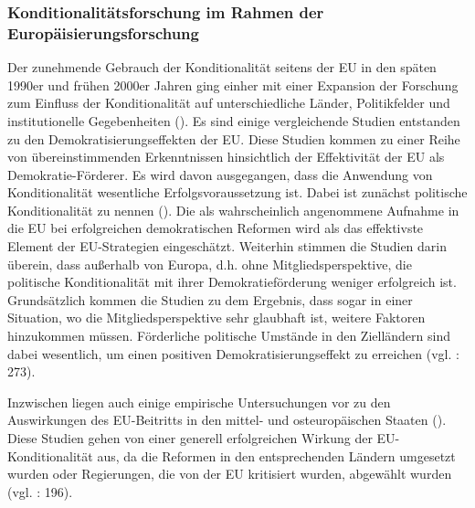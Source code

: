 \subsubsection{Konditionalitätsforschung im Rahmen der Europäisierungsforschung }
Der zunehmende Gebrauch der Konditionalität seitens der EU in den späten 1990er und frühen 2000er Jahren ging einher mit einer Expansion der Forschung zum Einfluss der Konditionalität auf unterschiedliche Länder, Politikfelder und institutionelle Gegebenheiten (\cite{grab99,grab01,grab03, schsed04, schsed05b,schsed05c,vachudova01, vachudova05}). Es sind einige vergleichende Studien entstanden zu den Demokratisierungseffekten der EU. Diese Studien kommen zu einer Reihe von übereinstimmenden Erkenntnissen hinsichtlich der Effektivität der EU als Demokratie-Förderer. Es wird davon ausgegangen, dass die Anwendung von Konditionalität wesentliche Erfolgsvoraussetzung ist. Dabei ist zunächst politische Konditionalität zu nennen (\cite{kelley, kubicek, pridham05,schetal, vachudova05, youngs}). Die als wahrscheinlich angenommene Aufnahme in die EU bei erfolgreichen demokratischen Reformen wird als das effektivste Element der EU-Strategien eingeschätzt. Weiterhin stimmen die Studien darin überein, dass außerhalb von Europa, d.h. ohne Mitgliedsperspektive, die politische Konditionalität mit ihrer Demokratieförderung weniger erfolgreich ist. Grundsätzlich kommen die Studien zu dem Ergebnis, dass sogar in einer Situation, wo die Mitgliedsperspektive sehr glaubhaft ist, weitere Faktoren hinzukommen müssen. Förderliche politische Umstände in den Zielländern sind dabei wesentlich, um einen positiven Demokratisierungseffekt zu erreichen (vgl. \cite{schsch07} : 273).\par
Inzwischen liegen auch einige empirische Untersuchungen vor zu den Auswirkungen des EU-Beitritts in den mittel- und osteuropäischen Staaten (\cite{dimit02, grab05, kneuer07, linden,schsed05a}). Diese Studien gehen von einer generell erfolgreichen Wirkung der EU-Konditionalität aus, da die Reformen in den entsprechenden Ländern umgesetzt wurden oder Regierungen, die von der EU kritisiert wurden, abgewählt wurden (vgl. \cite{brusis09} : 196).\par

